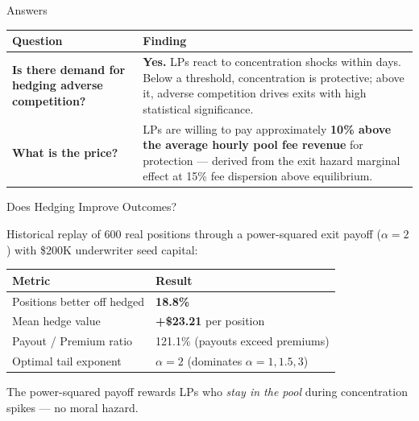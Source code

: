 \documentclass[aspectratio=169]{beamer}
\begin{document}
\begin{frame}{Answers}

\begin{center}
\renewcommand{\arraystretch}{1.8}
\begin{tabular}{@{}>{\bfseries}p{4.5cm} p{8cm}@{}}
\toprule
Question & Finding \\
\midrule
Is there demand for hedging adverse competition?
  & \textbf{Yes.} LPs react to concentration shocks within days. Below
    a threshold, concentration is protective; above it, adverse competition
    drives exits with high statistical significance. \\

What is the price?
  & LPs are willing to pay approximately \textbf{10\% above the average
    hourly pool fee revenue} for protection --- derived from the exit
    hazard marginal effect at 15\% fee dispersion above equilibrium. \\

\bottomrule
\end{tabular}
\end{center}

\end{frame}

\begin{frame}{Does Hedging Improve Outcomes?}

Historical replay of 600 real positions through a power-squared exit payoff
($\alpha = 2$) with \$200K underwriter seed capital:

\bigskip

\begin{center}
\renewcommand{\arraystretch}{1.5}
\begin{tabular}{@{}ll@{}}
\toprule
Metric & Result \\
\midrule
Positions better off hedged & \textbf{18.8\%} \\
Mean hedge value & \textbf{+\$23.21} per position \\
Payout / Premium ratio & 121.1\% (payouts exceed premiums) \\
Optimal tail exponent & $\alpha = 2$ (dominates $\alpha = 1, 1.5, 3$) \\
\bottomrule
\end{tabular}
\end{center}

\bigskip

The power-squared payoff rewards LPs who \emph{stay in the pool} during
concentration spikes --- no moral hazard.

\end{frame}
\end{document}
